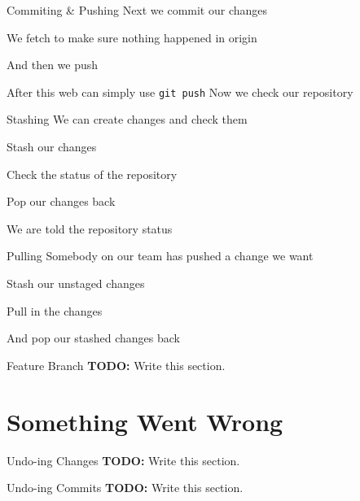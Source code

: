 \documentclass{beamer}
\begin{document}
  \begin{frame}[fragile=singleslide]{Commiting \& Pushing}
    Next we commit our changes
    
    We fetch to make sure nothing happened in origin
    
  \end{frame}
  \begin{frame}[fragile=singleslide]
    And then we push
    
    After this web can simply use \texttt{git push}
    Now we check our repository
    
  \end{frame}
  \begin{frame}[fragile=singleslide]{Stashing}
    We can create changes and check them
    
  \end{frame}
  \begin{frame}[fragile=singleslide]
    Stash our changes
    
    Check the status of the repository
    
  \end{frame}
  \begin{frame}[fragile=singleslide]
    Pop our changes back
    
    We are told the repository status
  \end{frame}
  \begin{frame}[fragile=singleslide]{Pulling}
    Somebody on our team has pushed a change we want
    
    Stash our unstaged changes
    
  \end{frame}
  \begin{frame}[fragile=singleslide]
    Pull in the changes
    
  \end{frame}
  \begin{frame}[fragile=singleslide]
    And pop our stashed changes back
    
  \end{frame}
  \begin{frame}{Feature Branch}
    \textbf{TODO:} Write this section.
  \end{frame}
  \section{Something Went Wrong}
  \begin{frame}{Undo-ing Changes}
    \textbf{TODO:} Write this section.
  \end{frame}
  \begin{frame}{Undo-ing Commits}
    \textbf{TODO:} Write this section.
  \end{frame}
\end{document}
